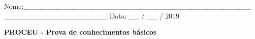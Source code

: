 \documentclass[a4paper, 12pt]{article}
\begin{document}

\begin{center}
Nome:\_\_\_\_\_\_\_\_\_\_\_\_\_\_\_\_\_\_\_\_\_\_\_\_\_\_\_\_\_\_\_\_\_\_\_\_\_\_\_\_\_\_\_\_\_\_\_\_\_\_\_\_\_\_\_\_\_\_\_\_\_\_\_\_ \hspace{3cm} Data: \_\_ / \_\_ / $2019$
\end{center}

\vspace{0.07 cm}

\begin{center}
	\begin{Large}
	\textbf{PROCEU - Prova de conhecimentos básicos}
	\end{Large}
\end{center}
			

\vspace{0.07 cm}
	
\end{document}
